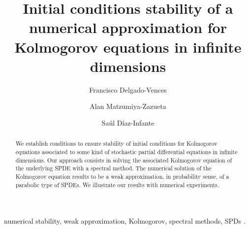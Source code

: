 \documentclass[longtitle, review, 12pt]{elsarticle}
\DeclareRobustCommand{\1}[1]{\ensuremath \mathbbm{1}_{\{#1\}}}
\begin{document}
    \begin{frontmatter}
        \title{
            Initial conditions stability of a numerical
            approximation for Kolmogorov equations 
            in infinite dimensions%
        }
        \author[add:CONACYT-IMATE]{%
            Francisco Delgado-Vences
        }%
        \author[add:unison]{%
            Alan Matzumiya-Zazueta
        }%
        \author[add:conacyt_unison]{%
            Sa\'ul D\'iaz-Infante
        }%
        \address[add:CONACYT-IMATE]{
            CONACYT-UNAM, 
            Instituto de Matem\'aticas, 
            Sede Oaxaca,
            Antonio de Le\'on \#2, altos, Col. Centro,
            Oaxaca de Ju\'arez, CP. 68000
            Phone: +52(951) 5160541
        }
        \address[add:conacyt_unison]{
            CONACYT-Universidad de Sonora, 
            Departamento de Matem\'aticas, Boulevard Luis Encinas y 
            Rosales S/N, 83000, Hermosillo, Sonora, M\'exico.
        }
%
        \address[add:unison]{
            Universidad de Sonora
            Departamento de Matem\'aticas,
            Departamento de Matem\'aticas. 
            Blvd Luis Encinas y Rosales S/N, 
            Colonia Centro. 
            Edificio 3K-1. C.P. 83000.
            Hermosillo, Sonora, M\'exico,
        }
        \begin{abstract}
                We establish conditions to ensure stability 
            of initial conditions for Kolmogorov equations associated to some 
            kind of stochastic partial differential equations in infinite 
            dimensions. Our approach consists in solving the associated 
            Kolmogorov equation of the underlying SPDE with a spectral method. 
            The numerical solution of the Kolmogorov equation results to be a 
            weak approximation, in probability sense, of a parabolic type of 
            SPDEs. We illustrate our results with numerical experiments. 
		\end{abstract}
		\begin{keyword}
			numerical stability,
			weak approximation,
			Kolmogorov,
			spectral methods,
			SPDs .
		\end{keyword}
	\end{frontmatter}
    \pagebreak
\end{document}
